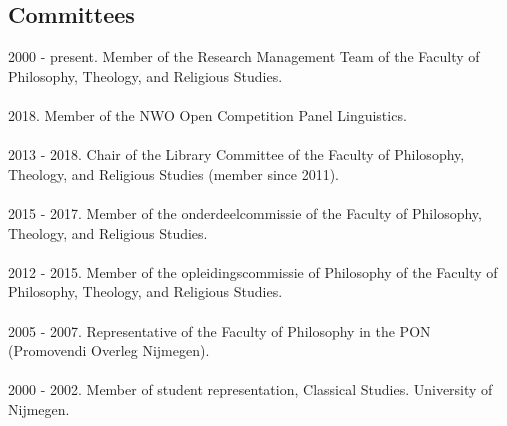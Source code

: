 \documentclass[a4paper,11pt]{article}
\begin{document}
\subsection*{Committees}
2000 - present. Member of the Research Management Team of the Faculty of Philosophy, Theology, and Religious Studies.\\\\
2018. Member of the NWO Open Competition Panel Linguistics.\\\\
2013 - 2018. Chair of the Library Committee of the Faculty of Philosophy, Theology, and Religious Studies (member since 2011).\\\\%
2015 - 2017. Member of the onderdeelcommissie of the Faculty of Philosophy, Theology, and Religious Studies.\\\\
2012 - 2015. Member of the opleidingscommissie of Philosophy of the Faculty of Philosophy, Theology, and Religious Studies.\\\\
 2005 -  2007. Representative of the Faculty of
Philosophy in the PON (Promovendi Overleg Nijmegen).\\\\
2000 - 2002. Member of student representation, Classical Studies. University of Nijmegen.\\\\
\end{document}

